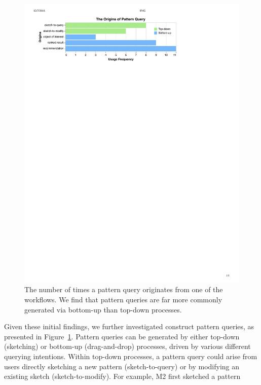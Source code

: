  \begin{figure}[h!]
   \includegraphics[width=0.95\linewidth]{figures/the_origins_of_sketch.pdf}
   \vspace{-5pt}
   \caption{The number of times a pattern query originates from one of the workflows. We find that pattern queries are far more commonly generated via bottom-up than top-down processes.}\label{fig:origins_of_sketch}
   \vspace{-5pt}
 \end{figure}
 \par Given these initial findings,
 we further investigated  construct pattern queries, as presented in Figure~\ref{fig:origins_of_sketch}.
 Pattern queries can be generated by
 either top-down (sketching) or
 bottom-up (drag-and-drop) processes,
 driven by various different querying intentions.
 Within top-down processes,
 a pattern query could arise
 from users directly sketching
 a new pattern (sketch-to-query)
 or by modifying an existing sketch (sketch-to-modify). For example, M2 first sketched a pattern
